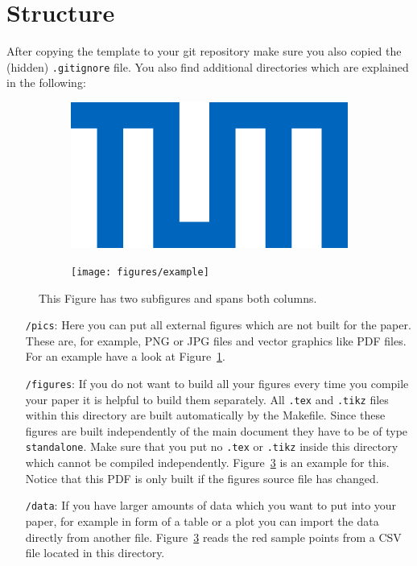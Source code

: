 \section{Structure}
After copying the template to your git repository make sure you also
copied the (hidden) \texttt{.gitignore} file.
You also find additional directories which are explained in the following:

\begin{figure}
		\centering
	\begin{subfigure}[c]{0.45\textwidth}
				\centering
		\includegraphics[width=.4\textwidth]{pics/example}
		\label{fig:external_pdf}	
	\end{subfigure}
	\begin{subfigure}[c]{0.45\textwidth}
		\texttt{[image: figures/example]}
		\label{fig:external_tex}
	\end{subfigure}
	\caption{This Figure has two subfigures and spans both columns.}
\end{figure}


\begin{itemize}
	\item[\texttt{/pics}:] Here you can put all external figures which are
	not built for the paper. These are, for example, PNG or JPG files and
	vector graphics like PDF files. For an example have a look at
	Figure~\ref{fig:external_pdf}.
	
	\item[\texttt{/figures}:] If you do not want to build all your figures
	every time you compile your paper it is helpful to build them
	separately. All \texttt{.tex} and \texttt{.tikz} files within this directory
	are built automatically by the Makefile. Since these figures are built
	independently of the main document they have to be of type
	\texttt{standalone}. Make sure that you put no \texttt{.tex} or
	\texttt{.tikz} inside this directory which cannot be compiled
	independently.
	Figure~\ref{fig:external_tex} is an example for this. Notice that this
	PDF is only built if the figures source file has changed.
	
	\item[\texttt{/data}:] If you have larger amounts of data which you
	want to put into your paper, for example in form of a table or a plot
	you can import the data directly from another file.
	Figure~\ref{fig:external_tex} reads the red sample points from a CSV
	file located in this directory.
\end{itemize}

